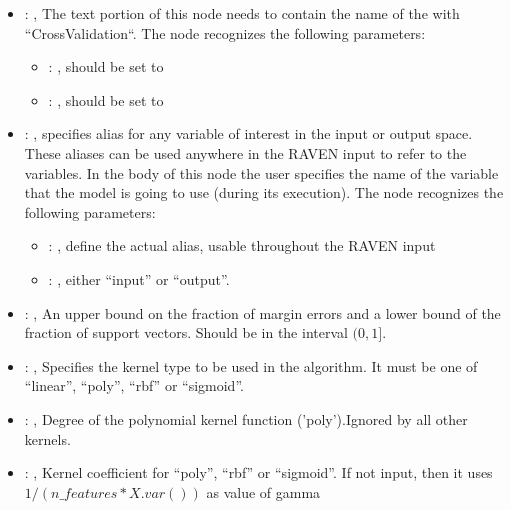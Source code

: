 \begin{itemize}
    \item {}: , 
      The text portion of this node needs to contain the name of the  with
               ``CrossValidation``.
      The  node recognizes the following parameters:
        \begin{itemize}
          \item {}: , 
            should be set to 
          \item {}: , 
            should be set to 
      \end{itemize}

    \item {}: , 
      specifies alias for         any variable of interest in the input or output space. These
      aliases can be used anywhere in the RAVEN input to         refer to the variables. In the body
      of this node the user specifies the name of the variable that the model is going to use
      (during its execution).
      The  node recognizes the following parameters:
        \begin{itemize}
          \item {}: , 
            define the actual alias, usable throughout the RAVEN input
          \item {}: , 
            either ``input'' or ``output''.
      \end{itemize}

    \item {}: , 
      An upper bound on the fraction of margin errors and
      a lower bound of the fraction of support vectors. Should be in the interval $(0, 1]$.

    \item {}: , 
      Specifies the kernel type to be used in the algorithm. It must be one of
      ``linear'', ``poly'', ``rbf'' or ``sigmoid''.

    \item {}: , 
      Degree of the polynomial kernel function ('poly').Ignored by all other kernels.

    \item {}: , 
      Kernel coefficient for ``poly'', ``rbf'' or ``sigmoid''. If not input, then it uses
      $1 / (n\_features * X.var())$ as value of gamma


\end{itemize}
